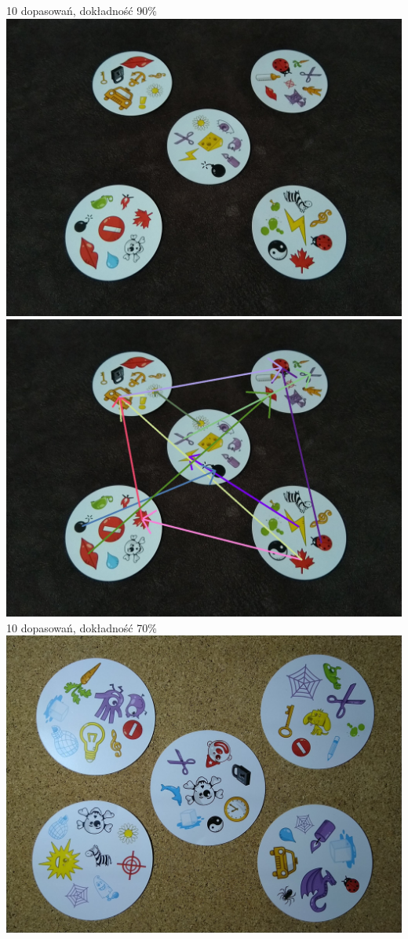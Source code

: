 \documentclass[10pt,a4paper]{article}
\begin{document}
\begin{center}
10 dopasowań, dokładność 90\%
\includegraphics[scale=0.28]{medium/dobble09.jpg}
\includegraphics[scale=0.28]{medium/img_arrows4.jpg}\\
10 dopasowań, dokładność 70\%
\includegraphics[scale=0.28]{medium/dobble18.jpg}

\end{center}
\end{document}
